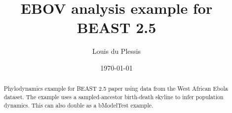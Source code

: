 \documentclass[10pt]{article}
\begin{document}
	\thispagestyle{plain}
	\title{EBOV analysis example for BEAST 2.5}  
	\author{Louis du Plessis}
	\date{\today}
	\maketitle

	
	\begin{abstract}
		Phylodynamics example for BEAST 2.5 paper using data from the West African Ebola dataset. The example uses a sampled-ancestor birth-death skyline to infer population dynamics. This can also double as a bModelTest example.
	\end{abstract}

	\tableofcontents

	\clearpage
	

	\clearpage
	\appendix
	\renewcommand{\thefigure}{S\arabic{figure}}
	\renewcommand{\thetable}{S\arabic{table}}	
	\setcounter{page}{1}
	\setcounter{figure}{0}
	

	\clearpage
	\printbibliography
\end{document}
